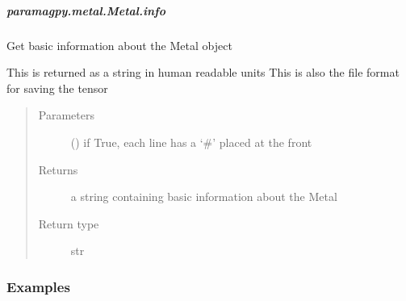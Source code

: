 \documentclass[a4paper,10pt,english]{sphinxmanual}
\begin{document}
\begin{fulllineitems}
\begin{fulllineitems}
\begin{fulllineitems}
\end{fulllineitems}



\subparagraph{paramagpy.metal.Metal.info}
\label{\detokenize{reference/generated/paramagpy.metal.Metal.info:paramagpy-metal-metal-info}}\label{\detokenize{reference/generated/paramagpy.metal.Metal.info::doc}}

\begin{fulllineitems}
\label{\detokenize{reference/generated/paramagpy.metal.Metal.info:paramagpy.metal.Metal.info}}
Get basic information about the Metal object

This is returned as a string in human readable units
This is also the file format for saving the tensor
\begin{quote}\begin{description}
\item[{Parameters}] \leavevmode
{} (\sphinxstyleliteralemphasis{\sphinxupquote{ (}}\sphinxstyleliteralemphasis{\sphinxupquote{)}}) \textendash{} if True, each line has a ‘\#’ placed at the front

\item[{Returns}] \leavevmode
{} \textendash{} a string containing basic information about the Metal

\item[{Return type}] \leavevmode
str

\end{description}\end{quote}
\subsubsection*{Examples}


\end{fulllineitems}
\end{fulllineitems}
\end{fulllineitems}
\end{document}
